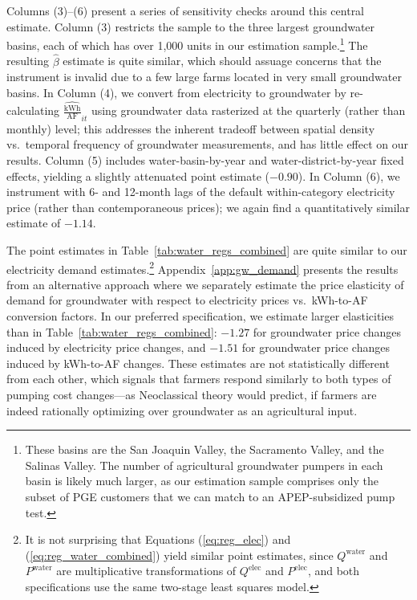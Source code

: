 Columns (3)--(6) present a series of sensitivity checks around this central estimate. Column (3) restricts the sample to the three largest groundwater basins, each of which has over 1,000 units in our estimation sample.\footnote{These basins are the San Joaquin Valley, the Sacramento Valley, and the Salinas Valley. The number of agricultural groundwater pumpers in each basin is likely much larger, as our estimation sample comprises only the subset of PGE customers that we can match to an APEP-subsidized pump test.} The resulting $\hat\beta$ estimate is quite similar, which should assuage concerns that the instrument is invalid due to a few large farms located in very small groundwater basins. 
In Column (4), we convert from electricity to groundwater by re-calculating $\widehat{\tfrac{{\text{kWh}}}{\text{AF}}}_{it}$ using groundwater data rasterized at the quarterly (rather than monthly) level; this addresses the inherent tradeoff between spatial density vs.\ temporal frequency of groundwater measurements, and has little effect on our results. 
Column (5) includes water-basin-by-year and water-district-by-year fixed effects, yielding a slightly attenuated point estimate ($-0.90$). In Column (6), we instrument with 6- and 12-month lags of the default within-category electricity price (rather than contemporaneous prices); we again find a quantitatively similar estimate of $-1.14$.

The point estimates in Table~\ref{tab:water_regs_combined} are quite similar to our electricity demand estimates.\footnote{
It is not surprising that Equations (\ref{eq:reg_elec}) and (\ref{eq:reg_water_combined}) yield similar point estimates, since $Q^{\text{water}}$ and $P^{\text{water}}$ are multiplicative transformations of $Q^{\text{elec}}$ and $P^{\text{elec}}$, and both specifications use the same two-stage least squares model.
}   Appendix~\ref{app:gw_demand} presents the results from an alternative approach where we separately estimate the price elasticity of demand for groundwater with respect to electricity prices vs.\ kWh-to-AF conversion factors. In our preferred specification, we estimate larger elasticities than in Table~\ref{tab:water_regs_combined}: $-1.27$ for groundwater price changes induced by electricity price changes, and $-1.51$ for groundwater price changes induced by kWh-to-AF changes. These estimates are not statistically different from each other, which signals that farmers respond similarly to both types of pumping cost changes---as Neoclassical theory would predict, if farmers are indeed rationally optimizing over groundwater as an agricultural input.


